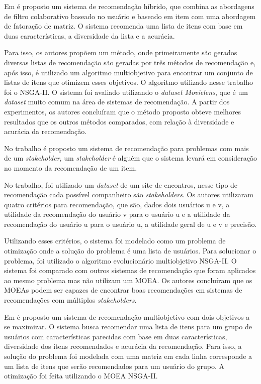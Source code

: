 Em \cite{wang2017multiobjective} é proposto um sistema de recomendação híbrido, que combina as abordagens de filtro colaborativo baseado no usuário e baseado em item com uma abordagem de fatoração de matriz. O sistema recomenda uma lista de itens com base em duas características, a diversidade da lista e a acurácia. 

Para isso, os autores propõem um método, onde primeiramente são gerados diversas listas de recomendação são geradas por três métodos de recomendação e, após isso, é utilizado um algoritmo multiobjetivo para encontrar um conjunto de listas de itens que otimizem esses objetivos. O algoritmo utilizado nesse trabalho foi o NSGA-II. O sistema foi avaliado utilizando o \textit{dataset}  \textit{Movielens}, que é um \textit{dataset} muito comum na área de sistemas de recomendação. A partir dos experimentos, os autores concluíram que o método proposto obteve melhores resultados que os outros métodos comparados, com relação à diversidade e acurácia da recomendação.

No trabalho \cite{zheng2018utility} é proposto um sistema de recomendação para problemas com mais de um \textit{stakeholder}, um \textit{stakeholder} é alguém que o sistema levará em consideração no momento da recomendação  de  um item.

 No trabalho, foi  utilizado um \textit{dataset} de um site de encontros, nesse tipo de recomendação cada possível companheiro são \textit{stakeholders}. Os autores utilizaram quatro critérios para recomendação, que são, dados dois usuários u e v, a utilidade da recomendação do usuário v  para o usuário u e a utilidade da recomendação do usuário u para o usuário u, a utilidade geral de u e v e  precisão.

 Utilizando esses critérios, o sistema foi modelado como um problema de otimização onde a solução do problema é uma lista de usuários. Para solucionar o problema, foi utilizado o algoritmo evolucionário multiobjetivo NSGA-II. O sistema foi comparado com outros sistemas de recomendação que foram aplicados ao mesmo problema mas não utilizam um MOEA. Os autores concluíram que os MOEAs podem ser capazes de encontrar boas recomendações em sistemas de recomendações com múltiplos \textit{stakeholders}.

Em \cite{zuo2015personalized} é proposto um sistema de recomendação multiobjetivo com dois objetivos a se maximizar. O sistema busca recomendar uma lista de itens para um grupo de usuários com características parecidas com base em duas características, diversidade dos itens recomendados e acurácia da recomendação. Para isso, a solução do problema foi modelada com uma matriz em cada linha corresponde a um lista de itens que serão recomendados para um usuário do grupo. A otimização foi feita utilizando o MOEA NSGA-II.

